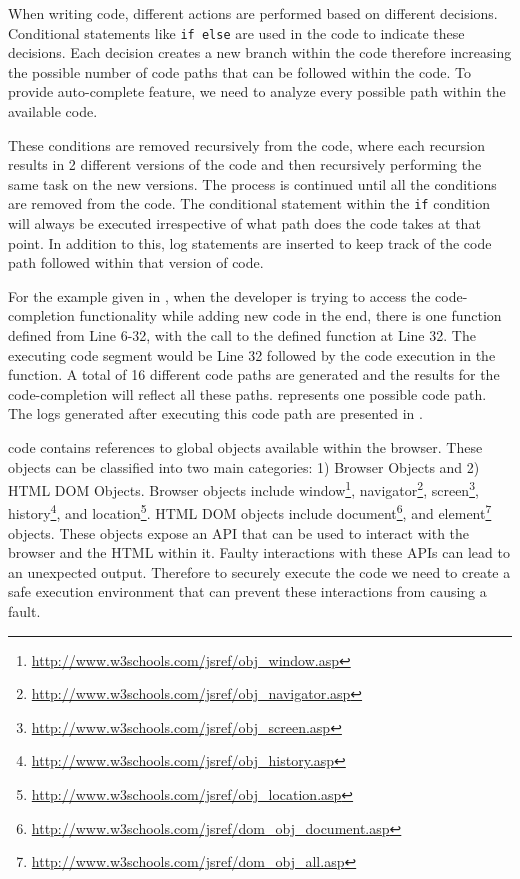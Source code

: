 		
		When writing code, different actions are performed based on different decisions. Conditional statements like \texttt{if else} are used in the code to indicate these decisions. Each decision creates a new branch within the code therefore increasing the possible number of code paths that can be followed within the code. To provide auto-complete feature, we need to analyze every possible path within the available \javascript code.
		
		These conditions are removed recursively from the code, where each recursion results in 2 different versions of the code and then recursively performing the same task on the new versions. The process is continued until all the conditions are removed from the code. The conditional statement within the \texttt{if} condition will always be executed irrespective of what path does the code takes at that point. In addition to this, log statements are inserted to keep track of the code path followed within that version of code.
		
		For the example given in , when the developer is trying to access the code-completion functionality while adding new code in the end, there is one function defined from Line 6-32, with the call to the defined function at Line 32. The executing code segment would be Line 32 followed by the code execution in the function. A total of 16 different code paths are generated and the results for the code-completion will reflect all these paths.  represents one possible code path. The logs generated after executing this code path are presented in .	
		
		
			\javascript code contains references to global objects available within the browser. These objects can be classified into two main categories: 1) Browser Objects and 2) HTML DOM Objects. Browser objects include window\footnote{\url{http://www.w3schools.com/jsref/obj_window.asp}}, navigator\footnote{\url{http://www.w3schools.com/jsref/obj_navigator.asp}}, screen\footnote{\url{http://www.w3schools.com/jsref/obj_screen.asp}}, history\footnote{\url{http://www.w3schools.com/jsref/obj_history.asp}},  and location\footnote{\url{http://www.w3schools.com/jsref/obj_location.asp}}. HTML DOM objects include document\footnote{\url{http://www.w3schools.com/jsref/dom_obj_document.asp}}, and element\footnote{\url{http://www.w3schools.com/jsref/dom_obj_all.asp}} objects. These objects expose an API that can be used to interact with the browser and the HTML within it. Faulty interactions with these APIs can lead to an unexpected output. Therefore to securely execute the code we need to create a safe execution environment that can prevent these interactions from causing a fault.
			
